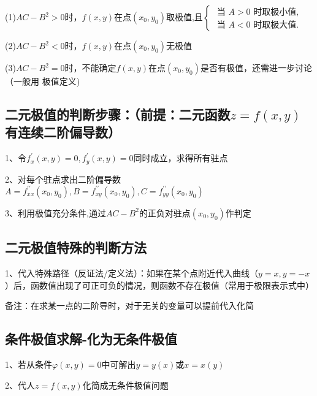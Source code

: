 (1)$A C-B^{2}>0$时，$f(x, y)$在点$\left(x_{0}, y_{0}\right)$取极值,且$\left\{\begin{array}{l}\text { 当 } A>0 \text { 时取极小值, } \\ \text { 当 } A<0 \text { 时取极大值. }\end{array}\right.$

(2)$A C-B^{2}<0$时，$f(x, y)$在点$\left(x_{0}, y_{0}\right)$无极值

(3)$A C-B^{2}=0$时，不能确定$f(x, y)$在点$\left(x_{0}, y_{0}\right)$是否有极值，还需进一步讨论（一般用 极值定义)



\subsection{二元极值的判断步骤：（前提：二元函数$z=f(x, y)$有连续二阶偏导数）}

1、令$f_{x}^{\prime}(x, y)=0, f_{y}^{\prime}(x, y)=0$同时成立，求得所有驻点

2、对每个驻点求出二阶偏导数$A=f_{x x}^{\prime \prime}\left(x_{0}, y_{0}\right), B=f_{x y}^{\prime \prime}\left(x_{0}, y_{0}\right), C=f_{y y}^{\prime \prime}\left(x_{0}, y_{0}\right)$

3、利用极值充分条件,通过$A C-B^{2}$的正负对驻点$\left(x_{0}, y_{0}\right)$作判定



\subsection{二元极值特殊的判断方法}

1、代入特殊路径（反证法/定义法）：如果在某个点附近代入曲线（$y=x,y=-x$）后，函数值出现了可正可负的情况，则函数不存在极值（常用于极限表示式中）

备注：在求某一点的二阶导时，对于无关的变量可以提前代入化简



\subsection{条件极值求解-化为无条件极值}

1、若从条件$\varphi(x, y)=0$中可解出$y=y(x)$或$x=x(y)$

2、代人$z=f(x, y)$化简成无条件极值问题

